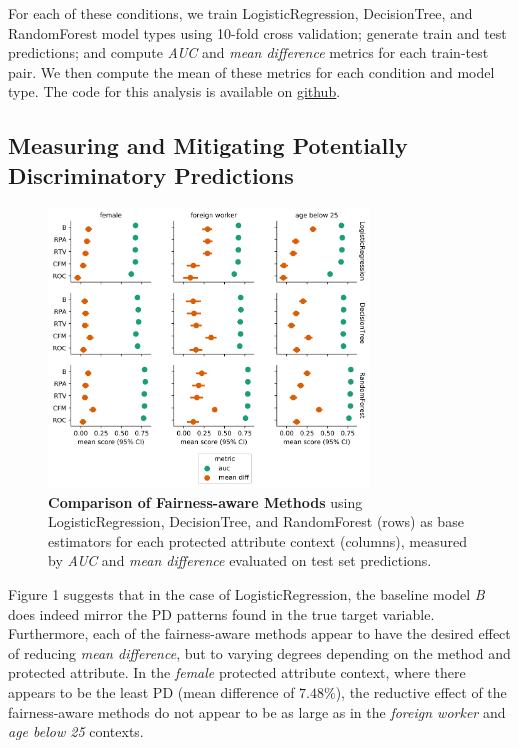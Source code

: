 \documentclass{acm_proc_article-sp}
\begin{document}
For each of these conditions, we train LogisticRegression, DecisionTree, and
RandomForest model types using 10-fold cross validation; generate train and test
predictions; and compute \emph{AUC} and \emph{mean difference} metrics for each
train-test pair. We then compute the mean of these metrics for each condition and
model type. The code for this analysis is available on
\href{https://github.com/cosmicBboy/themis-ml/blob/master/paper/Evaluating%20Themis-ml.ipynb}{\underline{github}}.

\subsection{Measuring and Mitigating Potentially Discriminatory Predictions}

\begin{figure}[h]
\centering
\includegraphics[width=8.5cm]{IMG/fairness_aware_comparison.png}
\caption{
  \textbf{Comparison of Fairness-aware Methods} using LogisticRegression,
  DecisionTree, and RandomForest (rows) as base estimators for each protected
  attribute context (columns), measured by \emph{AUC} and
  \emph{mean difference} evaluated on test set predictions.}
\label{figure-1-comparison-fa-methods}
\end{figure}

Figure 1 suggests that in the case of LogisticRegression, the baseline model
\emph{B} does indeed mirror the PD patterns found in the true target variable.
Furthermore, each of the fairness-aware methods appear to have the desired
effect of reducing \emph{mean difference}, but to varying degrees depending on
the method and protected attribute. In the \emph{female} protected attribute
context, where there appears to be the least PD (mean difference of \(7.48\%\)),
the reductive effect of the fairness-aware methods do not appear to be as
large as in the \emph{foreign worker} and \emph{age below 25} contexts.
\end{document}
